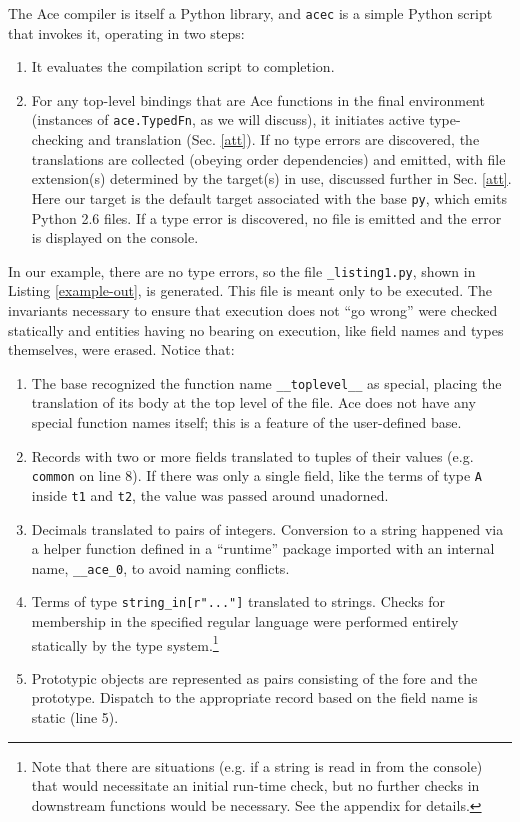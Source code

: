 \documentclass[10pt,preprint]{sigplanconf}
\begin{document}
{The Ace compiler is itself a Python library, and \verb|acec| is a simple Python script that invokes it, operating in two steps:
\begin{enumerate}
\item It evaluates the compilation script to completion.
\item For any top-level bindings that are Ace functions in the final environment (instances of \verb|ace.TypedFn|, as we will discuss), it initiates active type-checking and translation (Sec. \ref{att}). If no type errors are discovered, the translations are collected (obeying order dependencies) and emitted, with file extension(s) determined by the target(s) in use, discussed further in Sec. \ref{att}. Here our target is  the default target associated with the base \verb|py|, which emits Python 2.6 files. If a type error is discovered, no file is emitted and the error is displayed on the console.
\end{enumerate}

In our example, there are no type errors, so the file \verb|_listing1.py|, shown in Listing \ref{example-out},  is generated. This file is meant only to be executed. The invariants necessary to ensure that execution does not ``go wrong'' were checked statically and entities having no bearing on execution, like field names and types themselves, were erased. Notice that:
\begin{enumerate}
\item The base recognized the function name \verb|__toplevel__| as special, placing the translation of its body  at the top level of the file. Ace does not have any special function names itself; this is a feature of the user-defined base.
\item Records with two or more fields translated to tuples of their values (e.g. \verb|common| on line 8). If there was only a single field, like the terms of type \verb|A| inside \verb|t1| and \verb|t2|, the value was passed around unadorned. 
\item Decimals translated to pairs of integers. Conversion to a string happened via a helper function defined in a ``runtime'' package imported with an internal name, \verb|__ace_0|, to avoid naming conflicts. 
\item Terms of type \verb|string_in[r"..."]| translated to strings. Checks for membership in the specified regular language were performed entirely statically by the type system.\footnote{Note that there are situations (e.g. if a string is read in from the console) that would necessitate an initial run-time check, but no further checks in downstream functions would be necessary. See the appendix for details.}
\item Prototypic objects are represented as pairs consisting of the fore and the prototype. Dispatch to the appropriate record based on the field name is static (line 5).
\end{enumerate}

}
\end{document}
